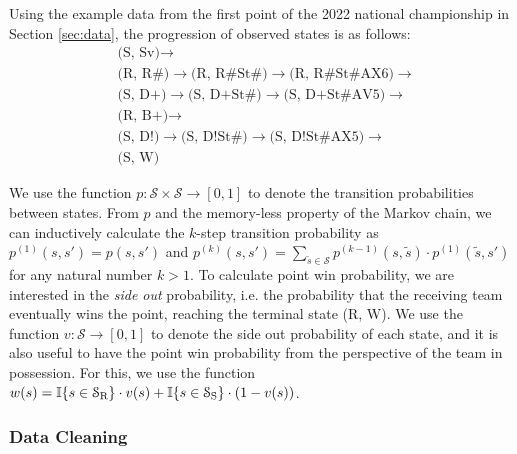 \documentclass[USenglish]{article}
\theoremstyle{dgthm}
\theoremstyle{dgdef}
\begin{document}
Using the example data from the first point of the 2022 national championship in Section \ref{sec:data}, the progression of observed states is as follows:
\begin{align*}
    &\mbox{(S, Sv)}  \rightarrow\\
    &\mbox{(R, R\#)} \rightarrow \mbox{(R, R\#St\#)} \rightarrow \mbox{(R, R\#St\#AX6)} \rightarrow\\
    &\mbox{(S, D+)}  \rightarrow \mbox{(S, D+St\#)}  \rightarrow \mbox{(S, D+St\#AV5)}  \rightarrow\\
    &\mbox{(R, B+)}  \rightarrow\\
    &\mbox{(S, D!)}  \rightarrow \mbox{(S, D!St\#)}  \rightarrow \mbox{(S, D!St\#AX5)}  \rightarrow\\
    &\mbox{(S, W)}
\end{align*}

We use the function $p: \mathcal{S} \times \mathcal{S} \rightarrow [0, 1]$ to denote the transition probabilities between states. From $p$ and the memory-less property of the Markov chain, we can inductively calculate the $k$-step transition probability as $p^{(1)}(s, s') = p(s, s')$ and $p^{(k)}(s, s') = \sum_{\tilde s \in \mathcal{S}}p^{(k-1)}(s, \tilde s) \cdot p^{(1)}(\tilde s, s')$ for any natural number $k > 1$. To calculate point win probability, we are interested in the {\it side out} probability, i.e. the probability that the receiving team eventually wins the point, reaching the terminal state (R, W). We use the function $v: \mathcal{S} \rightarrow [0, 1]$ to denote the side out probability of each state, and it is also useful to have the point win probability from the perspective of the team in possession. For this, we use the function $w(s) = \mathbb{I}\{s \in \mathcal{S}_{\mbox{\scriptsize R}}\} \cdot v(s) + \mathbb{I}\{s \in \mathcal{S}_{\mbox{\scriptsize S}}\} \cdot (1 - v(s))$.

\subsubsection{Data Cleaning}
\label{sec:data-cleaning}
\end{document}
